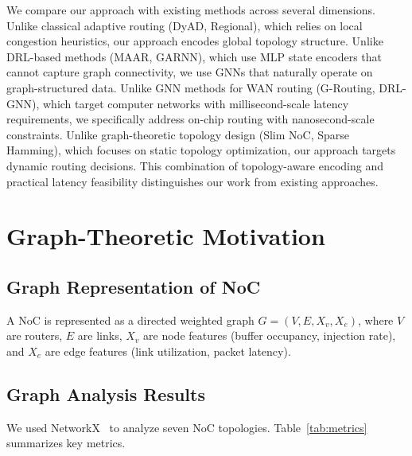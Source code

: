 \documentclass[conference]{IEEEtran}
\begin{document}
We compare our approach with existing methods across several dimensions. Unlike classical adaptive routing (DyAD, Regional), which relies on local congestion heuristics, our approach encodes global topology structure. Unlike DRL-based methods (MAAR, GARNN), which use MLP state encoders that cannot capture graph connectivity, we use GNNs that naturally operate on graph-structured data. Unlike GNN methods for WAN routing (G-Routing, DRL-GNN), which target computer networks with millisecond-scale latency requirements, we specifically address on-chip routing with nanosecond-scale constraints. Unlike graph-theoretic topology design (Slim NoC, Sparse Hamming), which focuses on static topology optimization, our approach targets dynamic routing decisions. This combination of topology-aware encoding and practical latency feasibility distinguishes our work from existing approaches.

\section{Graph-Theoretic Motivation}
\label{sec:problem}

\subsection{Graph Representation of NoC}

A NoC is represented as a directed weighted graph $G=(V,E,X_v,X_e)$, where $V$ are routers, $E$ are links, $X_v$ are node features (buffer occupancy, injection rate), and $X_e$ are edge features (link utilization, packet latency).

\subsection{Graph Analysis Results}

We used NetworkX~\cite{networkx2008} to analyze seven NoC topologies. Table~\ref{tab:metrics} summarizes key metrics.
\end{document}
